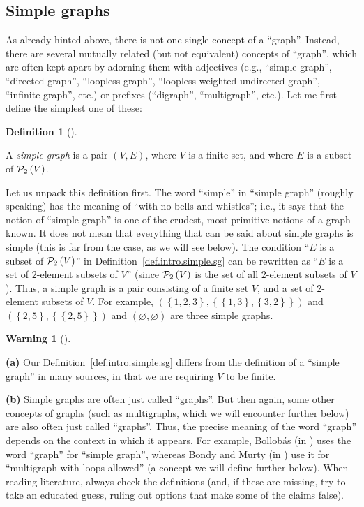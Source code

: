 \documentclass[numbers=enddot,12pt,final,onecolumn,notitlepage]{scrartcl}%
\theoremstyle{definition}
\newtheorem{defi}[theo]{Definition}
\newenvironment{definition}[1][]
{\begin{defi}[#1]\begin{leftbar}}
{\end{leftbar}\end{defi}}
\newtheorem{warn}[theo]{Warning}
\newenvironment{conclusion}[1][]
{\begin{warn}[#1]\begin{leftbar}}
{\end{leftbar}\end{warn}}
\newcommand{\powset}[2][]{\ifthenelse{\equal{#2}{}}{\mathcal{P}\left(#1\right)}{\mathcal{P}_{#1}\left(#2\right)}}
\newcommand{\set}[1]{\left\{ #1 \right\}}
\newcommand{\tup}[1]{\left( #1 \right)}
\begin{document}
\subsection{\label{sect.intro.simple}Simple graphs}

As already hinted above, there is not one single concept of a
``graph''. Instead, there are several mutually related (but not
equivalent) concepts of ``graph'', which are often kept apart by
adorning them with adjectives (e.g., ``simple graph'', ``directed
graph'', ``loopless graph'', ``loopless weighted undirected
graph'', ``infinite graph'', etc.) or prefixes (``digraph'',
``multigraph'', etc.). Let me first define the simplest one of these:

\begin{definition} \label{def.intro.simple.sg}
A \textit{simple graph} is a pair $\tup{V, E}$, where $V$ is a
finite set, and where $E$ is a subset of $\powset[2]{V}$.
\end{definition}

Let us unpack this definition first. The word ``simple'' in
``simple graph'' (roughly speaking) has the meaning of ``with no
bells and whistles''; i.e., it says that the notion of
``simple graph'' is one of the crudest, most primitive notions of
a graph known.
It does not mean
that everything that can be said about simple graphs is simple (this
is far from the case, as we will see below). The condition
``$E$ is a subset of $\powset[2]{V}$'' in
Definition~\ref{def.intro.simple.sg} can be rewritten as ``$E$ is a
set of $2$-element subsets of $V$'' (since $\powset[2]{V}$ is the set
of all $2$-element subsets of $V$). Thus, a simple graph is a pair
consisting of a finite set $V$, and a set of $2$-element subsets of
$V$.
For example,
$\left(\set{1,2,3}, \set{\set{1,3}, \set{3,2}} \right)$ and
$\left(\set{2,5}, \set{\set{2,5}}\right)$ and
$\left(\varnothing, \varnothing\right)$ are three simple graphs.

\begin{conclusion}
\textbf{(a)}
Our Definition~\ref{def.intro.simple.sg} differs from the definition
of a ``simple graph'' in many sources, in that we are requiring $V$ to
be finite.

\textbf{(b)}
Simple graphs are often just called ``graphs''. But then again, some
other concepts of graphs (such as multigraphs, which we will
encounter further below) are also often just called ``graphs''. Thus,
the precise meaning of the word ``graph'' depends on the context in
which it appears. For example, Bollob\'as (in \cite{Bollob79}) uses
the word ``graph'' for ``simple graph'', whereas Bondy and Murty
(in \cite{BonMur08}) use it for ``multigraph with loops allowed''
(a concept we will define further below).
When reading literature, always check the
definitions (and, if these are missing, try to take an educated guess,
ruling out options that make some of the claims false).
\end{conclusion}
\end{document}
